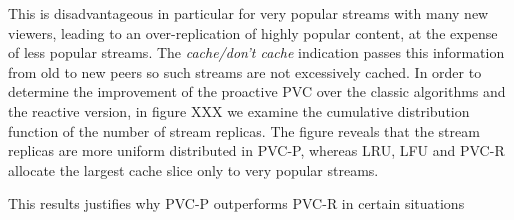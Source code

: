 \documentclass{acm_proc_article-sp}
\begin{document}
This is disadvantageous in particular for very popular streams with many new viewers, leading to an over-replication of highly popular content, at the expense of less popular streams. The \emph{cache/don't cache} indication passes this information from old to new peers so such streams are not excessively cached. In order to determine the improvement of the proactive PVC over the classic algorithms and the reactive version, in figure XXX we examine the cumulative distribution function of the number of stream replicas. The figure reveals that the stream replicas are more uniform distributed in PVC-P, whereas LRU, LFU and PVC-R allocate the largest cache slice only to very popular streams.

This results justifies why PVC-P outperforms PVC-R in certain situations




\balancecolumns
\end{document}

